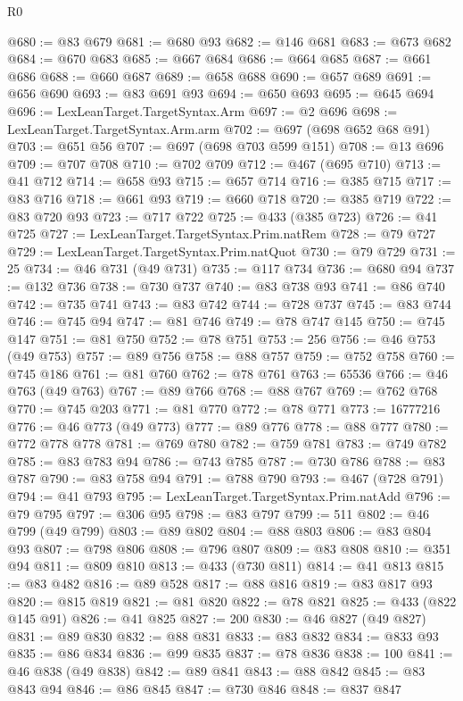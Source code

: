 \begin{lexlean}{R0}
\begin{coremodule}
@680 := @83 @679
@681 := @680 @93
@682 := @146 @681
@683 := @673 @682
@684 := @670 @683
@685 := @667 @684
@686 := @664 @685
@687 := @661 @686
@688 := @660 @687
@689 := @658 @688
@690 := @657 @689
@691 := @656 @690
@693 := @83 @691 @93
@694 := @650 @693
@695 := @645 @694
@696 := LexLeanTarget.TargetSyntax.Arm
@697 := @2 @696
@698 := LexLeanTarget.TargetSyntax.Arm.arm
@702 := @697 (@698 @652 @68 @91)
@703 := @651 @56
@707 := @697 (@698 @703 @599 @151)
@708 := @13 @696
@709 := @707 @708
@710 := @702 @709
@712 := @467 (@695 @710)
@713 := @41 @712
@714 := @658 @93
@715 := @657 @714
@716 := @385 @715
@717 := @83 @716
@718 := @661 @93
@719 := @660 @718
@720 := @385 @719
@722 := @83 @720 @93
@723 := @717 @722
@725 := @433 (@385 @723)
@726 := @41 @725
@727 := LexLeanTarget.TargetSyntax.Prim.natRem
@728 := @79 @727
@729 := LexLeanTarget.TargetSyntax.Prim.natQuot
@730 := @79 @729
@731 := 25
@734 := @46 @731 (@49 @731)
@735 := @117 @734
@736 := @680 @94
@737 := @132 @736
@738 := @730 @737
@740 := @83 @738 @93
@741 := @86 @740
@742 := @735 @741
@743 := @83 @742
@744 := @728 @737
@745 := @83 @744
@746 := @745 @94
@747 := @81 @746
@749 := @78 @747 @145
@750 := @745 @147
@751 := @81 @750
@752 := @78 @751
@753 := 256
@756 := @46 @753 (@49 @753)
@757 := @89 @756
@758 := @88 @757
@759 := @752 @758
@760 := @745 @186
@761 := @81 @760
@762 := @78 @761
@763 := 65536
@766 := @46 @763 (@49 @763)
@767 := @89 @766
@768 := @88 @767
@769 := @762 @768
@770 := @745 @203
@771 := @81 @770
@772 := @78 @771
@773 := 16777216
@776 := @46 @773 (@49 @773)
@777 := @89 @776
@778 := @88 @777
@780 := @772 @778 @778
@781 := @769 @780
@782 := @759 @781
@783 := @749 @782
@785 := @83 @783 @94
@786 := @743 @785
@787 := @730 @786
@788 := @83 @787
@790 := @83 @758 @94
@791 := @788 @790
@793 := @467 (@728 @791)
@794 := @41 @793
@795 := LexLeanTarget.TargetSyntax.Prim.natAdd
@796 := @79 @795
@797 := @306 @95
@798 := @83 @797
@799 := 511
@802 := @46 @799 (@49 @799)
@803 := @89 @802
@804 := @88 @803
@806 := @83 @804 @93
@807 := @798 @806
@808 := @796 @807
@809 := @83 @808
@810 := @351 @94
@811 := @809 @810
@813 := @433 (@730 @811)
@814 := @41 @813
@815 := @83 @482
@816 := @89 @528
@817 := @88 @816
@819 := @83 @817 @93
@820 := @815 @819
@821 := @81 @820
@822 := @78 @821
@825 := @433 (@822 @145 @91)
@826 := @41 @825
@827 := 200
@830 := @46 @827 (@49 @827)
@831 := @89 @830
@832 := @88 @831
@833 := @83 @832
@834 := @833 @93
@835 := @86 @834
@836 := @99 @835
@837 := @78 @836
@838 := 100
@841 := @46 @838 (@49 @838)
@842 := @89 @841
@843 := @88 @842
@845 := @83 @843 @94
@846 := @86 @845
@847 := @730 @846
@848 := @837 @847

\end{coremodule}
\end{lexlean}
